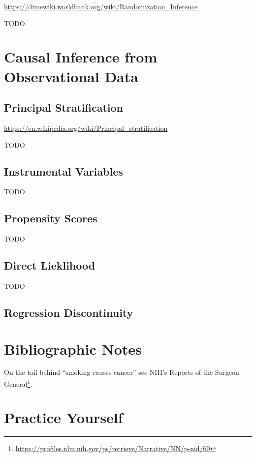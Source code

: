 \documentclass[]{book}
\renewcommand{\href}[2]{#2\footnote{\url{#1}}}
\theoremstyle{definition}
\theoremstyle{definition}
\theoremstyle{definition}
\theoremstyle{remark}
\begin{document}
\url{https://dimewiki.worldbank.org/wiki/Randomization_Inference}

TODO

\hypertarget{causal-inference-from-observational-data}{%
\section{Causal Inference from Observational Data}\label{causal-inference-from-observational-data}}

\hypertarget{principal-stratification}{%
\subsection{Principal Stratification}\label{principal-stratification}}

\citet{frumento2012evaluating}

\url{https://en.wikipedia.org/wiki/Principal_stratification}

TODO

\hypertarget{instrumental-variables}{%
\subsection{Instrumental Variables}\label{instrumental-variables}}

TODO

\hypertarget{propensity-scores}{%
\subsection{Propensity Scores}\label{propensity-scores}}

TODO

\hypertarget{direct-lieklihood}{%
\subsection{Direct Lieklihood}\label{direct-lieklihood}}

TODO

\hypertarget{regression-discontinuity}{%
\subsection{Regression Discontinuity}\label{regression-discontinuity}}

\hypertarget{bibliographic-notes-19}{%
\section{Bibliographic Notes}\label{bibliographic-notes-19}}

On the tail behind ``smoking causes cancer'' see \href{https://profiles.nlm.nih.gov/ps/retrieve/Narrative/NN/p-nid/60}{NIH's Reports of the Surgeon General}.

\hypertarget{practice-yourself-18}{%
\section{Practice Yourself}\label{practice-yourself-18}}


\end{document}
